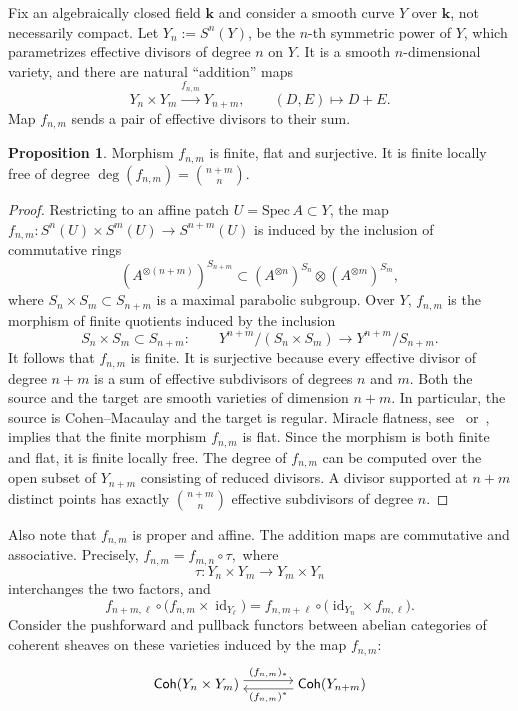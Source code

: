 \documentclass{article}
\def\lra{\longrightarrow}
\newcommand{\Coh}{\mathsf{Coh}}
\newcommand{\kk}{\mathbf{k}}
\theoremstyle{definition}
\newtheorem{prop}[thm]{Proposition}
\theoremstyle{definition}
\begin{document}
Fix an algebraically closed field $\kk$ and consider a smooth curve $Y$ over $\kk$, not necessarily compact. Let $Y_n:=S^n(Y)$, be the $n$-th symmetric power of $Y$,
which parametrizes effective divisors of degree $n$ on $Y$. It is a smooth $n$-dimensional variety, and there are natural ``addition'' maps
\begin{equation}
    Y_n \times Y_m \stackrel{f_{n,m}}{\lra} Y_{n+m}, \qquad
(D,E)\longmapsto D+E.
\end{equation}
Map $f_{n,m}$ sends a pair of effective divisors to their sum.

\begin{prop}\label{prop_good_morphism}
    Morphism $f_{n,m}$ is finite, flat and surjective. It is finite locally free of degree $\deg(f_{n,m})=\binom{n+m}{n}.$
\end{prop}

\begin{proof}
Restricting to an affine patch $U=\mathrm{Spec}\, A\subset Y$, the map $f_{n,m}:S^n(U)\times S^m(U)\lra S^{n+m}(U)$ is induced by the inclusion of commutative rings
\[
(A^{\otimes (n+m)})^{S_{n+m}} \subset (A^{\otimes n})^{S_n} \otimes (A^{\otimes m})^{S_m},
\]
where $S_n\times S_m\subset S_{n+m}$ is a maximal parabolic subgroup.
Over $Y$, $f_{n,m}$ is the morphism of finite quotients induced by the inclusion
\[
S_n\times S_m
\subset
S_{n+m}\colon
\qquad
Y^{n+m}/(S_n\times S_m)
\longrightarrow
Y^{n+m}/ S_{n+m}.
\]
It follows that $f_{n,m}$ is finite. It is surjective because every effective divisor of degree $n+m$ is a sum of effective subdivisors of degrees $n$ and $m$. Both the source and the target are smooth varieties of dimension $n+m$. In particular, the source is Cohen--Macaulay and the target is regular. Miracle flatness, see~\cite[Theorem 18.16(b)]{Eisenbud} or~\cite[Tag 00R4]{stacks-project},  implies that the finite morphism $f_{n,m}$ is flat. Since the morphism is both finite and flat, it is finite locally free. The degree of $f_{n,m}$ can be computed over the open subset of $Y_{n+m}$ consisting of reduced divisors. A divisor supported at $n+m$ distinct points has exactly $
\binom{n+m}{n}$
effective subdivisors of degree $n$.
\end{proof}

Also note that $f_{n,m}$ is proper and affine.
The addition maps are commutative and associative. Precisely,
$f_{n,m}=f_{m,n}\circ\tau,$
where
\[
\tau\colon Y_n\times Y_m\longrightarrow Y_m\times Y_n
\]
interchanges the two factors, and
\[
f_{n+m,\ell}\circ
\bigl(f_{n,m}\times\operatorname{id}_{Y_\ell}\bigr)
=
f_{n,m+\ell}\circ
\bigl(\operatorname{id}_{Y_n}\times f_{m,\ell}\bigr).
\]
Consider the pushforward and pullback functors between abelian categories of coherent sheaves on these varieties induced by the map $f_{n,m}$:
\begin{equation}\label{eq_maps_fnm}
\begin{tikzcd}[cramped, sep=large]
\Coh(Y_n\times Y_m)
  \arrow[r, shift left=0.7ex, "{(f_{n,m})_*}"]
& \Coh(Y_{n+m})
  \arrow[l, shift left=0.7ex, "{(f_{n,m})^*}"]
\end{tikzcd}
\end{equation}
\end{document}
